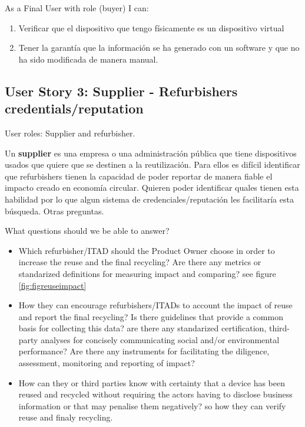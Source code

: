 \documentclass[
]{book}
\providecommand{\tightlist}{%
  \setlength{\itemsep}{0pt}\setlength{\parskip}{0pt}}
\begin{document}
As a Final User with role (buyer) I can:

\begin{enumerate}
\def\labelenumi{\arabic{enumi}.}
\item
  Verificar que el dispositivo que tengo físicamente es un dispositivo virtual
\item
  Tener la garantía que la información se ha generado con un software y que no ha sido modificada de manera manual.
\end{enumerate}

\hypertarget{user-story-3-supplier---refurbishers-credentialsreputation}{%
\subsection{User Story 3: Supplier - Refurbishers credentials/reputation}\label{user-story-3-supplier---refurbishers-credentialsreputation}}

User roles: Supplier and refurbisher.

Un \textbf{supplier} es una empresa o una administración pública que tiene dispositivos usados que quiere que se destinen a la reutilización. Para ellos es difícil identificar que refurbishers tienen la capacidad de poder reportar de manera fiable el impacto creado en economía circular. Quieren poder identificar quales tienen esta habilidad por lo que algun sistema de credenciales/reputación les facilitaría esta búsqueda. Otras preguntas.

What questions should we be able to answer?

\begin{itemize}
\tightlist
\item
  Which refurbisher/ITAD should the Product Owner choose in order to increase the reuse and the final recycling? Are there any metrics or standarized definitions for measuring impact and comparing? see figure \ref{fig:figreuseimpact}
\item
  How they can encourage refurbishers/ITADs to account the impact of reuse and report the final recycling? Is there guidelines that provide a common basis for collecting this data? are there any standarized certification, third-party analyses for concisely communicating social and/or environmental performance? Are there any instruments for facilitating the diligence, assessment, monitoring and reporting of impact?
\item
  How can they or third parties know with certainty that a device has been reused and recycled without requiring the actors having to disclose business information or that may penalise them negatively? so how they can verify reuse and finaly recycling.
\end{itemize}
\end{document}
